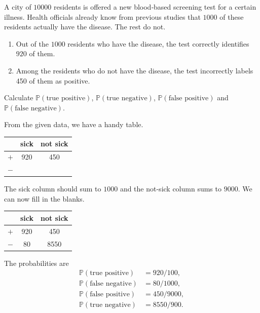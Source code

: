\documentclass[../main.tex]{subfiles}
\begin{document}
\begin{exercise}
  A city of \(10000\) residents is offered a new blood‑based screening test for a certain illness.  Health officials already know from previous studies that \(1000\) of these residents actually have the disease. The rest do not.

  \begin{enumerate}
    \item Out of the \(1000\) residents who have the disease, the test correctly identifies \(920\) of them.
    \item Among the residents who do not have the disease, the test incorrectly labels 450 of them as positive.
  \end{enumerate}

  Calculate \(\mathbb{P}(\text{true positive})\), \(\mathbb{P}(\text{true negative})\), \(\mathbb{P}(\text{false positive})\) and \(\mathbb{P}(\text{false negative})\).

  \begin{solution}
    From the given data, we have a handy table.

    \begin{center}
      \begin{tabular}{l|c||c}
      & sick & not sick \\\midrule
        \(+\) & 920 & 450 \\\midrule
        \(-\) & & 
      \end{tabular}
    \end{center}

    The sick column should sum to \(1000\) and the not-sick column sums to \(9000\). We can now fill in the blanks.
    \begin{center}
      \begin{tabular}{l|c||c}
      & sick & not sick \\\midrule
        \(+\) & 920 & 450 \\\midrule
        \(-\) & 80 & 8550
      \end{tabular}
    \end{center}

    The probabilities are
    \begin{align*}
      \mathbb{P}(\text{true positive}) &= 920/100, \\
      \mathbb{P}(\text{false negative}) &= 80/1000, \\
      \mathbb{P}(\text{false positive}) &= 450/9000, \\
      \mathbb{P}(\text{true negative}) &=  8550/900.
    \end{align*}

  \end{solution}
\end{exercise}
\end{document}
